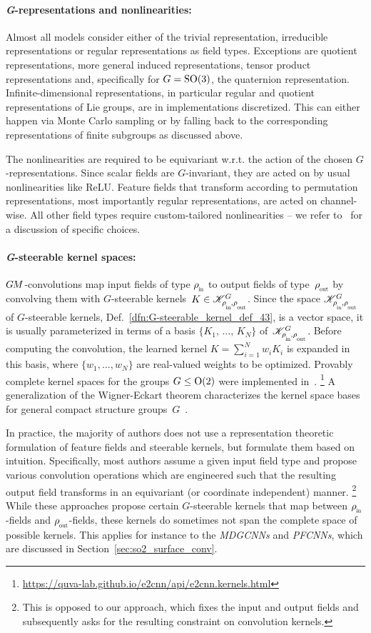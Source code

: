 \paragraph{\textit{G}-representations and nonlinearities:}
Almost all models consider either of the trivial representation, irreducible representations or regular representations as field types.
Exceptions are quotient representations, more general induced representations, tensor product representations and, specifically for $G=\operatorname{SO}(3)$, the quaternion representation.
Infinite-dimensional representations, in particular regular and quotient representations of Lie groups, are in implementations discretized.
This can either happen via Monte Carlo sampling or by falling back to the corresponding representations of finite subgroups as discussed above.

The nonlinearities are required to be equivariant w.r.t. the action of the chosen $G$-representations.
Since scalar fields are $G$-invariant, they are acted on by usual nonlinearities like ReLU.
Feature fields that transform according to permutation representations, most importantly regular representations, are acted on channel-wise.
All other field types require custom-tailored nonlinearities -- we refer to~\cite{Weiler2019_E2CNN} for a discussion of specific choices.




\paragraph{\textit{G}-steerable kernel spaces:}
$G\mkern-1.4muM$-convolutions map input fields of type $\rhoin$ to output fields of type~$\rhoout$ by convolving them with $G$-steerable kernels~$K\in\KG$.
Since the space $\KG$ of $G$-steerable kernels, Def.~\ref{dfn:G-steerable_kernel_def_43}, is a vector space, it is usually parameterized in terms of a basis $\{K_1,\,\dots,\,K_N\}$ of~$\KG$.
\mbox{Before} computing the convolution, the learned kernel $K = \sum_{i=1}^N w_i K_i$ is expanded in this basis, where $\{w_1,\dots,w_N\}$ are real-valued weights to be optimized.
Provably complete kernel spaces for the groups $G\leq\operatorname{O}(2)$ were implemented in~\cite{Weiler2019_E2CNN}.%
\footnote{\url{https://quva-lab.github.io/e2cnn/api/e2cnn.kernels.html}}
A generalization of the Wigner-Eckart theorem characterizes the kernel space bases for general compact structure groups~$G$~\cite{lang2020WignerEckart}.


In practice, the majority of authors does not use a representation theoretic formulation of feature fields and steerable kernels, but formulate them based on intuition.
Specifically, most authors assume a given input field type and propose various convolution operations which are engineered such that the resulting output field transforms in an equivariant (or coordinate independent) manner.%
\footnote{
    This is opposed to our approach, which fixes the input and output fields and subsequently asks for the resulting constraint on convolution kernels.
}
While these approaches propose certain $G$-steerable kernels that map between $\rhoin$-fields and $\rhoout$-fields, these kernels do sometimes not span the complete space of possible kernels.
This applies for instance to the \emph{MDGCNNs} and \emph{PFCNNs}, which are discussed in Section~\ref{sec:so2_surface_conv}.
